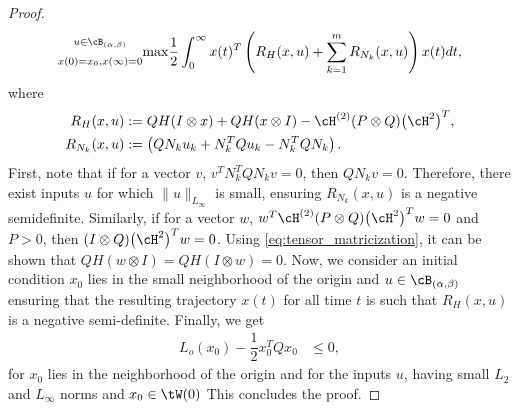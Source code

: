 \begin{proof}
\begin{align*}
{\begin{subarray}{c}
  	u\in \cB_{(\alpha,\beta)} \\[5pt]
  	x(0) = x_0,x(\infty)=0
  	\end{subarray}  }{\max}\dfrac{1}{2}\int_0^\infty x(t)^T\left(R_H(x,u) + \sum_{k=1}^mR_{N_k}(x,u)\right) x(t)dt,
\end{align*}
where
\begin{align*}
R_H(x,u) &:=   QH (I\otimes x) + QH (x\otimes I) - \cH^{(2)} (P\otimes Q)  \big(\cH^{2}\big)^T, \\
 R_{N_k}(x,u) &:=  \left(QN_ku_k + N_k^T Qu_k- N_k^TQN_k\right).
\end{align*}
First, note that if for a vector $v$, $v^TN_k^TQN_kv = 0$, then $QN_kv = 0$. Therefore, there exist inputs $u$ for which $\|u\|_{L_\infty}$ is small, ensuring $R_{N_k}(x,u)$ is a negative semidefinite. Similarly, if for a vector $w$, $w^T\cH^{(2)} (P\otimes Q)  \big(\cH^{2}\big)^T w = 0$ and $P>0$, then $ (I\otimes Q)  \big(\cH^{2}\big)^Tw= 0$. Using \eqref{eq:tensor_matricization}, it can be shown that $QH(w\otimes I) = QH(I\otimes w) = 0$.  Now, we consider an initial condition $x_0$ lies in the small neighborhood of the origin and $u \in \cB_{(\alpha,\beta)}$  ensuring that the resulting trajectory $x(t)$ for all time $t$ is such that $R_H(x,u)$ is a negative semi-definite. Finally, we get
 \begin{align*}
 L_o(x_0)- \dfrac{1}{2}x_0^TQx_0 &\leq 0,
 \end{align*}
for $x_0$ lies in the neighborhood of the origin and for the inputs $u$, having small $L_2$ and $L_\infty$ norms and $x_0 \in \tW(0)$ This concludes the proof.
\end{proof}

